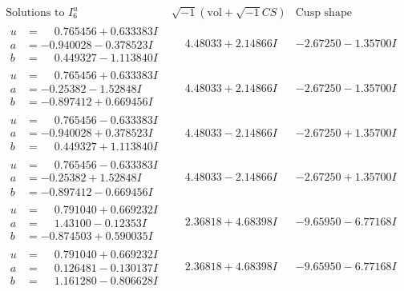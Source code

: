 \documentclass[1p]{elsarticle_modified}
\theoremstyle{definition}
\newcommand{\I}{\sqrt{-1}}
\begin{document}
$$\begin{array}{c|c|c}  
\text{Solutions to }I^u_{6}& \I (\text{vol} + \sqrt{-1}CS) & \text{Cusp shape}\\
 \hline 
\begin{aligned}
u &= \phantom{-}0.765456 + 0.633383 I \\
a &= -0.940028 - 0.378523 I \\
b &= \phantom{-}0.449327 - 1.113840 I\end{aligned}
 & \phantom{-}4.48033 + 2.14866 I & -2.67250 - 1.35700 I \\ \hline\begin{aligned}
u &= \phantom{-}0.765456 + 0.633383 I \\
a &= -0.25382 - 1.52848 I \\
b &= -0.897412 + 0.669456 I\end{aligned}
 & \phantom{-}4.48033 + 2.14866 I & -2.67250 - 1.35700 I \\ \hline\begin{aligned}
u &= \phantom{-}0.765456 - 0.633383 I \\
a &= -0.940028 + 0.378523 I \\
b &= \phantom{-}0.449327 + 1.113840 I\end{aligned}
 & \phantom{-}4.48033 - 2.14866 I & -2.67250 + 1.35700 I \\ \hline\begin{aligned}
u &= \phantom{-}0.765456 - 0.633383 I \\
a &= -0.25382 + 1.52848 I \\
b &= -0.897412 - 0.669456 I\end{aligned}
 & \phantom{-}4.48033 - 2.14866 I & -2.67250 + 1.35700 I \\ \hline\begin{aligned}
u &= \phantom{-}0.791040 + 0.669232 I \\
a &= \phantom{-}1.43100 - 0.12353 I \\
b &= -0.874503 + 0.590035 I\end{aligned}
 & \phantom{-}2.36818 + 4.68398 I & -9.65950 - 6.77168 I \\ \hline\begin{aligned}
u &= \phantom{-}0.791040 + 0.669232 I \\
a &= \phantom{-}0.126481 - 0.130137 I \\
b &= \phantom{-}1.161280 - 0.806628 I\end{aligned}
 & \phantom{-}2.36818 + 4.68398 I & -9.65950 - 6.77168 I \\ \hline\begin{aligned}

\end{aligned}
\end{array}$$
\end{document}
